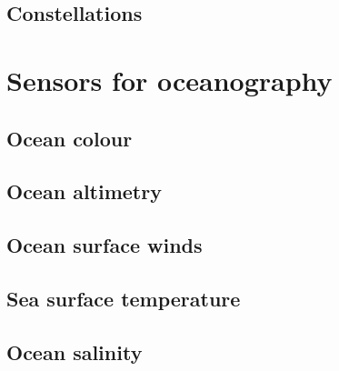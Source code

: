  {\small\textit{\lipsum[1-2]}}

\subsection{Constellations}
\label{subsec:Constellations}

 {\small\textit{\lipsum[1-2]}}
    

\section{Sensors for oceanography}
\label{sec:Oceanography_Sensors}

 {\small\textit{\lipsum[1-2]}}

\subsection{Ocean colour}
\label{subsec:Ocean_colour}

 {\small\textit{\lipsum[1-2]}}

\subsection{Ocean altimetry}
\label{subsec:Ocean_altimetry}

 {\small\textit{\lipsum[1-2]}}

\subsection{Ocean surface winds}
\label{subsec:Ocean_winds}

 {\small\textit{\lipsum[1-2]}}

\subsection{Sea surface temperature}
\label{subsec:Ocean_temperature}

 {\small\textit{\lipsum[1-2]}}

\subsection{Ocean salinity}
\label{subsec:Ocean_salinity}

